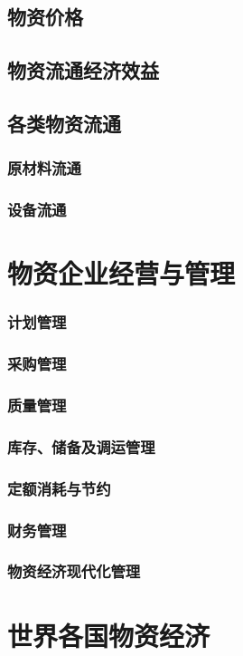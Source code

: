 \documentclass[UTF8]{../../RepresentationUniverse}
\begin{document}
    \subsection{物资价格}
    \subsection{物资流通经济效益}
    \subsection{各类物资流通}
        \subsubsection{原材料流通}
        \subsubsection{设备流通}

\section{物资企业经营与管理}
    \subsubsection{计划管理}
    \subsubsection{采购管理}
    \subsubsection{质量管理}
    \subsubsection{库存、储备及调运管理}
    \subsubsection{定额消耗与节约}
    \subsubsection{财务管理}
    \subsubsection{物资经济现代化管理}

\section{世界各国物资经济}
\end{document}
